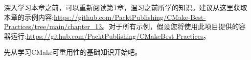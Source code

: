 深入学习本章之前，可以重新阅读第1章，温习之前所学的知识。建议从这里获取本章的示例内容:\url{https://github.com/PacktPublishing/CMake-Best-Practices/tree/main/chapter\_13}。对于所有示例，假设您将使用此项目提供的容器运行:\url{https://github.com/PacktPublishing/CMakeBest-Practices}。

先从学习CMake可重用性的基础知识开始吧。